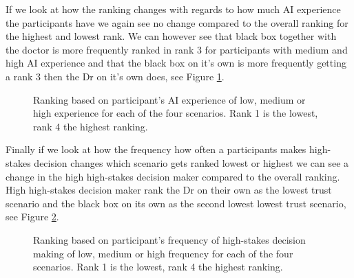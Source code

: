\documentclass[manuscript,screen,review]{acmart}
\begin{document}
If we look at how the ranking changes with regards to how much AI experience the participants have we again see no change compared to the overall ranking for the highest and lowest rank. We can however see that black box together with the doctor is more frequently ranked in rank 3 for participants with medium and high AI experience and that the black box on it's own is more frequently getting a rank 3 then the Dr on it's own does, see Figure \ref{fig:ranking-ai}.

\begin{figure}[h]
    \caption{Ranking based on participant's AI experience of low, medium or high experience for each of the four scenarios. Rank 1 is the lowest, rank 4 the highest ranking.}
    \label{fig:ranking-ai}
\end{figure}

Finally if we look at how the frequency how often a participants makes high-stakes decision changes which scenario gets ranked lowest or highest we can see a change in the high high-stakes decision maker compared to the overall ranking. High high-stakes decision maker rank the Dr on their own as the lowest trust scenario and the black box on its own as the second lowest lowest trust scenario, see Figure \ref{fig:ranking-highstakes-decision}.

\begin{figure}[h]
    \caption{Ranking based on participant's frequency of high-stakes decision making of low, medium or high frequency for each of the four scenarios. Rank 1 is the lowest, rank 4 the highest ranking.}
    \label{fig:ranking-highstakes-decision}
\end{figure}
\end{document}
